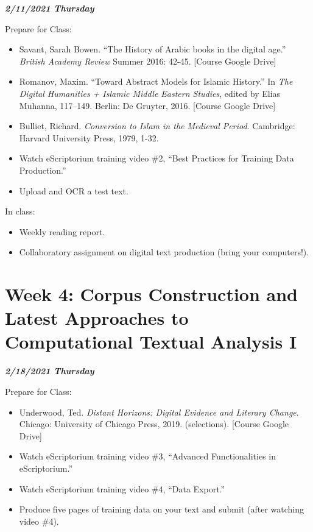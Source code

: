 \documentclass[
]{book}
\providecommand{\tightlist}{%
  \setlength{\itemsep}{0pt}\setlength{\parskip}{0pt}}
\begin{document}
\textbf{\emph{2/11/2021 Thursday}}

Prepare for Class:

\begin{itemize}
\tightlist
\item
  Savant, Sarah Bowen. ``The History of Arabic books in the digital age.'' \emph{British Academy Review} Summer 2016: 42-45. {[}Course Google Drive{]}\\
\item
  Romanov, Maxim. ``Toward Abstract Models for Islamic History.'' In \emph{The Digital Humanities + Islamic Middle Eastern Studies}, edited by Elias Muhanna, 117--149. Berlin: De Gruyter, 2016. {[}Course Google Drive{]}
\item
  Bulliet, Richard. \emph{Conversion to Islam in the Medieval Period}. Cambridge: Harvard University Press, 1979, 1-32.
\item
  Watch eScriptorium training video \#2, ``Best Practices for Training Data Production.''
\item
  Upload and OCR a test text.
\end{itemize}

In class:

\begin{itemize}
\tightlist
\item
  Weekly reading report.
\item
  Collaboratory assignment on digital text production (bring your computers!).
\end{itemize}

\hypertarget{week-4-corpus-construction-and-latest-approaches-to-computational-textual-analysis-i-1}{%
\chapter{Week 4: Corpus Construction and Latest Approaches to Computational Textual Analysis I}\label{week-4-corpus-construction-and-latest-approaches-to-computational-textual-analysis-i-1}}

\textbf{\emph{2/18/2021 Thursday}}

Prepare for Class:

\begin{itemize}
\tightlist
\item
  Underwood, Ted. \emph{Distant Horizons: Digital Evidence and Literary Change}. Chicago: University of Chicago Press, 2019. (selections). {[}Course Google Drive{]}
\item
  Watch eScriptorium training video \#3, ``Advanced Functionalities in eScriptorium.''
\item
  Watch eScriptorium training video \#4, ``Data Export.''
\item
  Produce five pages of training data on your text and submit (after watching video \#4).
\end{itemize}
\end{document}
